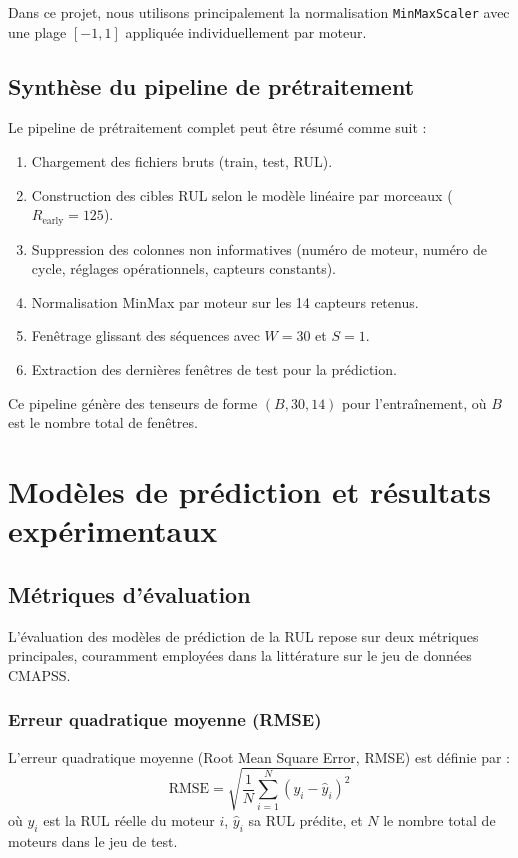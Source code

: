 \documentclass[12pt,a4paper]{report}
\theoremstyle{definition}
\begin{document}
Dans ce projet, nous utilisons principalement la normalisation \texttt{MinMaxScaler} avec une plage $[-1, 1]$ appliquée individuellement par moteur.

\section{Synthèse du pipeline de prétraitement}

Le pipeline de prétraitement complet peut être résumé comme suit :
\begin{enumerate}
    \item Chargement des fichiers bruts (train, test, RUL).
    \item Construction des cibles RUL selon le modèle linéaire par morceaux ($R_{\text{early}} = 125$).
    \item Suppression des colonnes non informatives (numéro de moteur, numéro de cycle, réglages opérationnels, capteurs constants).
    \item Normalisation MinMax par moteur sur les 14 capteurs retenus.
    \item Fenêtrage glissant des séquences avec $W = 30$ et $S = 1$.
    \item Extraction des dernières fenêtres de test pour la prédiction.
\end{enumerate}

Ce pipeline génère des tenseurs de forme $(B, 30, 14)$ pour l'entraînement, où $B$ est le nombre total de fenêtres.

\chapter{Modèles de prédiction et résultats expérimentaux}\label{chap:modeles}

\section{Métriques d'évaluation}

L'évaluation des modèles de prédiction de la RUL repose sur deux métriques principales, couramment employées dans la littérature sur le jeu de données CMAPSS.

\subsection{Erreur quadratique moyenne (RMSE)}

L'erreur quadratique moyenne (Root Mean Square Error, RMSE) est définie par :
\begin{equation}
    \text{RMSE} = \sqrt{\frac{1}{N} \sum_{i=1}^{N} (y_i - \hat{y}_i)^2}
\end{equation}
où $y_i$ est la RUL réelle du moteur $i$, $\hat{y}_i$ sa RUL prédite, et $N$ le nombre total de moteurs dans le jeu de test.
\end{document}
